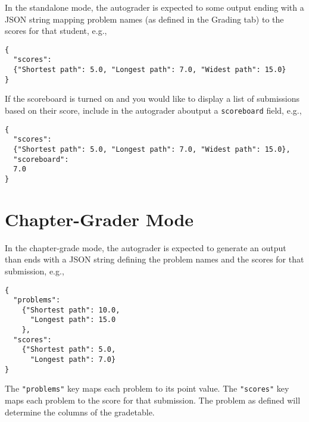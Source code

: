 \begin{gram}
\label{sec:codelabs::standalone::output}

In the standalone mode, the autograder is expected to some output ending with a JSON string mapping problem names (as defined in the Grading tab) to the scores for that student, e.g.,
  
\begin{lstlisting}
{
  "scores":
  {"Shortest path": 5.0, "Longest path": 7.0, "Widest path": 15.0}
}
\end{lstlisting}

If the scoreboard is turned on and you would like to display a list of
submissions based on their score, include in the autograder aboutput a \lstinline`scoreboard` field, e.g.,


\begin{lstlisting}
{
  "scores":
  {"Shortest path": 5.0, "Longest path": 7.0, "Widest path": 15.0},
  "scoreboard": 
  7.0  
}
\end{lstlisting}
  
\end{gram}


\section{Chapter-Grader Mode}
\label{sec:codelabs::chapter}

\begin{gram}
\label{sec:codelabs::chapter::output}
  
In the chapter-grade mode, the autograder is expected to generate an
output than ends with a JSON string defining the problem names and the
scores for that submission, e.g.,
  
\begin{lstlisting}
{
  "problems":
    {"Shortest path": 10.0,
      "Longest path": 15.0
    },
  "scores":
    {"Shortest path": 5.0,
      "Longest path": 7.0}
}
\end{lstlisting}

The \lstinline`"problems"` key maps each problem to its point value.
The \lstinline`"scores"` key maps each problem to the score for that submission.
The problem as defined will determine the columns of the gradetable.
\end{gram}
